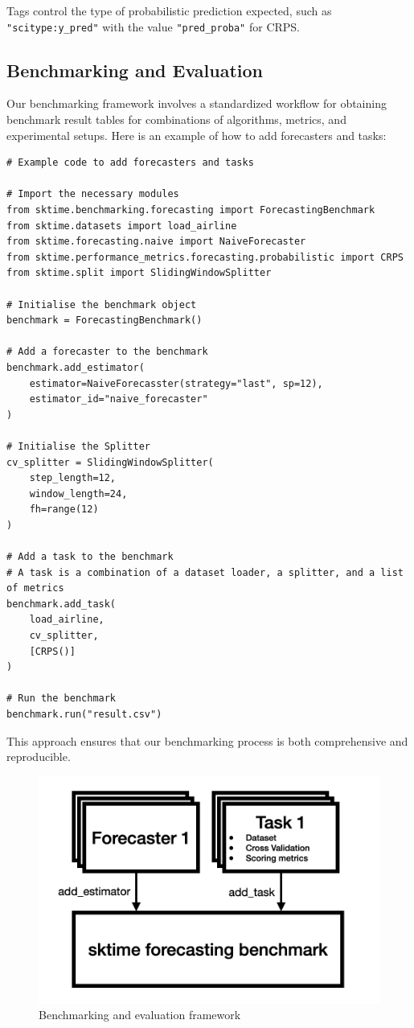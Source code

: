 Tags control the type of probabilistic prediction expected, such as \texttt{"scitype:y\_pred"} with the value \texttt{"pred\_proba"} for CRPS.

\subsection{Benchmarking and Evaluation}
Our benchmarking framework involves a standardized workflow for obtaining benchmark result tables for combinations of algorithms, metrics, and experimental setups. Here is an example of how to add forecasters and tasks:

\begin{verbatim}
# Example code to add forecasters and tasks

# Import the necessary modules
from sktime.benchmarking.forecasting import ForecastingBenchmark
from sktime.datasets import load_airline
from sktime.forecasting.naive import NaiveForecaster
from sktime.performance_metrics.forecasting.probabilistic import CRPS
from sktime.split import SlidingWindowSplitter

# Initialise the benchmark object
benchmark = ForecastingBenchmark()

# Add a forecaster to the benchmark
benchmark.add_estimator(
    estimator=NaiveForecasster(strategy="last", sp=12),
    estimator_id="naive_forecaster"
)     

# Initialise the Splitter
cv_splitter = SlidingWindowSplitter(
    step_length=12,
    window_length=24,
    fh=range(12)
)

# Add a task to the benchmark
# A task is a combination of a dataset loader, a splitter, and a list of metrics
benchmark.add_task(
    load_airline,
    cv_splitter,
    [CRPS()]
)

# Run the benchmark
benchmark.run("result.csv")
\end{verbatim}

This approach ensures that our benchmarking process is both comprehensive and reproducible. 

\begin{figure}
    \centering
    \includegraphics[width=.5\textwidth]{Figures/evaluationFramework.png}
    \caption{Benchmarking and evaluation framework}
    \label{fig:enter-label}
\end{figure}

